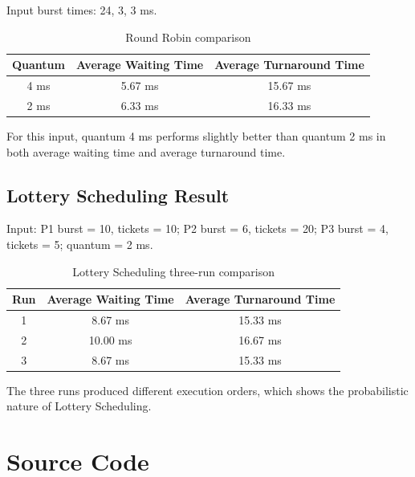 \documentclass[12pt,a4paper]{article}
\begin{document}
Input burst times: 24, 3, 3 ms.

\begin{table}[H]
\centering
\caption{Round Robin comparison}
\begin{tabular}{ccc}
\toprule
\textbf{Quantum} & \textbf{Average Waiting Time} & \textbf{Average Turnaround Time} \\
\midrule
4 ms & 5.67 ms & 15.67 ms \\
2 ms & 6.33 ms & 16.33 ms \\
\bottomrule
\end{tabular}
\end{table}


For this input, quantum 4 ms performs slightly better than quantum 2 ms in both average waiting time and average turnaround time.

\subsection{Lottery Scheduling Result}

Input: P1 burst = 10, tickets = 10; P2 burst = 6, tickets = 20; P3 burst = 4, tickets = 5; quantum = 2 ms.

\begin{table}[H]
\centering
\caption{Lottery Scheduling three-run comparison}
\begin{tabular}{ccc}
\toprule
\textbf{Run} & \textbf{Average Waiting Time} & \textbf{Average Turnaround Time} \\
\midrule
1 & 8.67 ms & 15.33 ms \\
2 & 10.00 ms & 16.67 ms \\
3 & 8.67 ms & 15.33 ms \\
\bottomrule
\end{tabular}
\end{table}


The three runs produced different execution orders, which shows the probabilistic nature of Lottery Scheduling.

\appendix

\section{Source Code}


\end{document}
